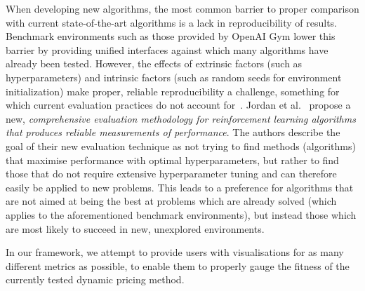 When developing new algorithms, the most common barrier to proper comparison with current state-of-the-art algorithms is a lack in reproducibility of results. Benchmark environments such as those provided by OpenAI Gym \cite{OpenAIGym} lower this barrier by providing unified interfaces against which many algorithms have already been tested. However, the effects of extrinsic factors (such as hyperparameters) and intrinsic factors (such as random seeds for environment initialization) make proper, reliable reproducibility a challenge, something for which current evaluation practices do not account for~\cite{DRLThatMatters}. Jordan et al.~\cite{EvaluatingPerformance} propose a new, \emph{comprehensive evaluation methodology for reinforcement learning algorithms that produces reliable measurements of performance}. The authors describe the goal of their new evaluation technique as not trying to find methods (algorithms) that maximise performance with optimal hyperparameters, but rather to find those that do not require extensive hyperparameter tuning and can therefore easily be applied to new problems. This leads to a preference for algorithms that are not aimed at being the best at problems which are already solved (which applies to the aforementioned benchmark environments), but instead those which are most likely to succeed in new, unexplored environments.

In our framework, we attempt to provide users with visualisations for as many different metrics as possible, to enable them to properly gauge the fitness of the currently tested dynamic pricing method.